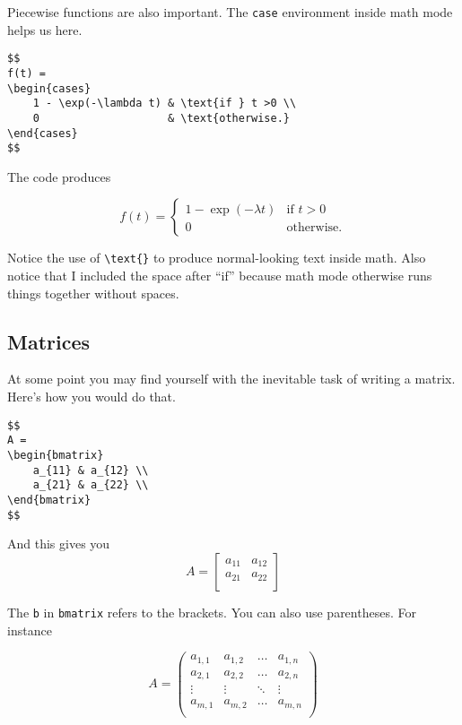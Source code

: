 Piecewise functions are also important. The \texttt{case} environment inside math mode helps us here.

\begin{lstlisting}
$$
f(t) =
\begin{cases}
	1 - \exp(-\lambda t) & \text{if } t >0 \\
	0                    & \text{otherwise.}
\end{cases}
$$
\end{lstlisting}

The code produces

$$
f(t) =
\begin{cases}
	1 - \exp(-\lambda t) & \text{if } t >0 \\
	0                    & \text{otherwise.}
\end{cases}
$$

Notice the use of \verb|\text{}| to produce normal-looking text inside math. Also notice that I included the space after ``if'' because math mode otherwise runs things together without spaces.

\subsection{Matrices}

At some point you may find yourself with the inevitable task of writing a matrix. Here's how you would do that.

\begin{lstlisting}
$$
A =
\begin{bmatrix}
	a_{11} & a_{12} \\
	a_{21} & a_{22} \\
\end{bmatrix}
$$
\end{lstlisting}

And this gives you 
$$
A =
\begin{bmatrix}
a_{11} & a_{12} \\
a_{21} & a_{22} \\
\end{bmatrix}
$$

The \texttt{b} in \texttt{bmatrix} refers to the brackets. You can also use parentheses. For instance

$$
A =
\begin{pmatrix}
	a_{1,1} & a_{1,2} & \ldots & a_{1,n} \\
	a_{2,1} & a_{2,2} & \ldots & a_{2,n} \\
	\vdots & \vdots   & \ddots & \vdots \\
	a_{m,1} & a_{m,2} & \ldots & a_{m,n}  \\
\end{pmatrix}
$$

